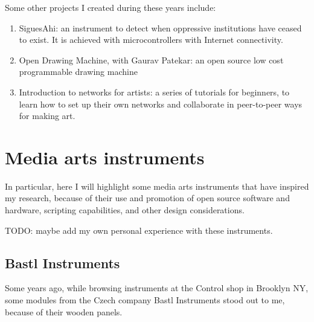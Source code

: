 Some other projects I created during these years include:

\begin{enumerate}
  \item SiguesAhi: an instrument to detect when oppressive institutions have ceased to exist. It is achieved with microcontrollers with Internet connectivity.
  \item Open Drawing Machine, with Gaurav Patekar: an open source low cost programmable drawing machine
  \item Introduction to networks for artists: a series of tutorials for beginners, to learn how to set up their own networks and collaborate in peer-to-peer ways for making art.
\end{enumerate}

\section{Media arts instruments}

In particular, here I will highlight some media arts instruments that have inspired my research, because of their use and promotion of open source software and hardware, scripting capabilities, and other design considerations.

TODO: maybe add my own personal experience with these instruments.

\subsection{Bastl Instruments}

Some years ago, while browsing instruments at the Control shop in Brooklyn NY, some modules from the Czech company Bastl Instruments stood out to me, because of their wooden panels.

